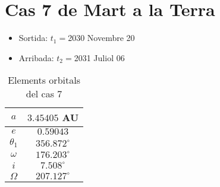 \section{Cas 7 de Mart a la Terra}
\begin{itemize}
	\item Sortida: $t_{1}=$2030 Novembre 20
	\item Arribada: $t_{2}=$2031 Juliol 06
\end{itemize}
\begin{table}[h!]
	\centering
	\begin{tabular}{ |c|c|}
		\hline
		$a$ & $3.45405$ AU \\ \hline
		$e$ & $0.59043$ \\ \hline
		$\theta_{1}$ & $356.872^{\circ}$ \\ \hline
		$\omega$ & $176.203^{\circ}$ \\ \hline
		$i$ & $7.508^{\circ}$ \\ \hline
		$\Omega$ & $207.127^{\circ}$ \\ \hline
	\end{tabular}
	\caption{Elements orbitals del cas 7}
\end{table}